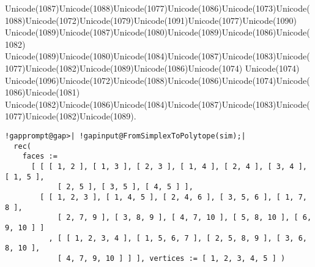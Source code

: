 \documentclass[a4paper,11pt]{report}
\begin{document}
{{{ Unicode(1087)Unicode(1088)Unicode(1077)Unicode(1086)Unicode(1073)Unicode(1088)Unicode(1072)Unicode(1079)Unicode(1091)Unicode(1077)Unicode(1090)
Unicode(1089)Unicode(1087)Unicode(1080)Unicode(1089)Unicode(1086)Unicode(1082)
Unicode(1089)Unicode(1080)Unicode(1084)Unicode(1087)Unicode(1083)Unicode(1077)Unicode(1082)Unicode(1089)Unicode(1086)Unicode(1074)
Unicode(1074)
Unicode(1096)Unicode(1072)Unicode(1088)Unicode(1086)Unicode(1074)Unicode(1086)Unicode(1081)
Unicode(1082)Unicode(1086)Unicode(1084)Unicode(1087)Unicode(1083)Unicode(1077)Unicode(1082)Unicode(1089). 
\begin{Verbatim}[commandchars=!@|,fontsize=\small,frame=single,label=Пример]
  !gapprompt@gap>| !gapinput@FromSimplexToPolytope(sim);|
  rec(
    faces :=
      [ [ [ 1, 2 ], [ 1, 3 ], [ 2, 3 ], [ 1, 4 ], [ 2, 4 ], [ 3, 4 ], [ 1, 5 ],
            [ 2, 5 ], [ 3, 5 ], [ 4, 5 ] ],
        [ [ 1, 2, 3 ], [ 1, 4, 5 ], [ 2, 4, 6 ], [ 3, 5, 6 ], [ 1, 7, 8 ],
            [ 2, 7, 9 ], [ 3, 8, 9 ], [ 4, 7, 10 ], [ 5, 8, 10 ], [ 6, 9, 10 ] ]
          , [ [ 1, 2, 3, 4 ], [ 1, 5, 6, 7 ], [ 2, 5, 8, 9 ], [ 3, 6, 8, 10 ],
            [ 4, 7, 9, 10 ] ] ], vertices := [ 1, 2, 3, 4, 5 ] )
  						
\end{Verbatim}
 }

 }

 
}
\end{document}

